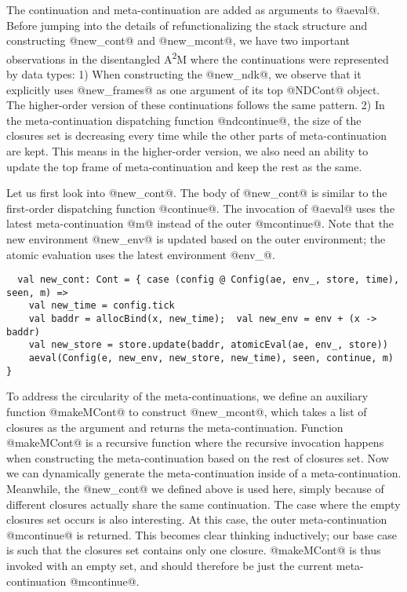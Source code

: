 \documentclass[acmsmall, screen]{acmart}\settopmatter{}
\begin{document}
The continuation and meta-continuation are added as arguments to @aeval@.
Before jumping into the details of refunctionalizing the stack structure and constructing
@new_cont@ and @new_mcont@, we have two important observations in the disentangled A\textsuperscript{2}M
where the continuations were represented by data types:
1) When constructing the @new_ndk@, we observe that it explicitly uses @new_frames@ as one
argument of its top @NDCont@ object. The higher-order version of these continuations follows
the same pattern.
2) In the meta-continuation dispatching function @ndcontinue@, the size of the closures set is
decreasing every time while the other parts of meta-continuation are kept. This means in
the higher-order version, we also need an ability to update the top frame of meta-continuation
and keep the rest as the same.

Let us first look into @new_cont@. The body of @new_cont@ is similar to the first-order dispatching
function @continue@. The invocation of @aeval@ uses the latest
meta-continuation @m@ instead of the outer @mcontinue@. Note that the
new environment @new_env@ is updated based on the outer environment;
the atomic evaluation uses the latest environment @env_@.

\begin{lstlisting}
  val new_cont: Cont = { case (config @ Config(ae, env_, store, time), seen, m) =>
    val new_time = config.tick
    val baddr = allocBind(x, new_time);  val new_env = env + (x -> baddr)
    val new_store = store.update(baddr, atomicEval(ae, env_, store))
    aeval(Config(e, new_env, new_store, new_time), seen, continue, m) }
\end{lstlisting}

To address the circularity of the meta-continuations, we define an auxiliary function
@makeMCont@ to construct @new_mcont@, which takes a list of closures as the argument and returns the meta-continuation.
Function @makeMCont@ is a recursive function where the recursive invocation happens when
constructing the meta-continuation based on the rest of closures set.
Now we can dynamically generate the meta-continuation inside of a meta-continuation.
Meanwhile, the @new_cont@ we defined above is used here, simply because of different closures
actually share the same continuation.
The case where the empty closures set occurs is also interesting. At this case,
the outer meta-continuation @mcontinue@ is returned.
This becomes clear thinking inductively; our base case is such that the closures set contains only one
closure. @makeMCont@ is thus invoked with an empty set, and should therefore be just the
current meta-continuation @mcontinue@.
\end{document}
